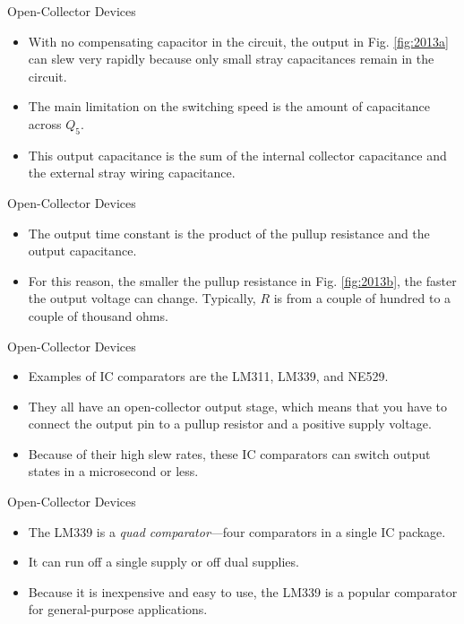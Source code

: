 \documentclass[pdflatex,compress]{beamer}
\begin{document}
\begin{frame}{Open-Collector Devices}
	\begin{itemize}
		\item With no compensating capacitor in the circuit, the output in Fig. \ref{fig:2013a} can slew very rapidly because only small stray capacitances remain in the circuit.
		\item The main limitation on the switching speed is the amount of capacitance across $Q_5$.
		\item This output capacitance is the sum of the internal collector capacitance and the external stray wiring capacitance.
	\end{itemize}
\end{frame}

\begin{frame}{Open-Collector Devices}
	\begin{itemize}
		\item The output time constant is the product of the pullup resistance and the output capacitance. 
		\item For this reason, the smaller the pullup resistance in Fig. \ref{fig:2013b}, the faster the output voltage can change.
		Typically, $R$ is from a couple of hundred to a couple of thousand ohms.
	\end{itemize}
\end{frame}			

\begin{frame}{Open-Collector Devices}
	\begin{itemize}
		\item Examples of IC comparators are the LM311, LM339, and NE529.
		\item They all have an open-collector output stage, which means that you have to connect the output pin to a pullup resistor and a positive supply voltage.
		\item Because of their high slew rates, these IC comparators can switch output states in a microsecond or less.
	\end{itemize}
\end{frame}

\begin{frame}{Open-Collector Devices}
	\begin{itemize}
		\item The LM339 is a \textit{quad comparator}—four comparators in a single IC package. 
		\item It can run off a single supply or off dual supplies.
		\item Because it is inexpensive and easy to use, the LM339 is a popular comparator for general-purpose applications.
	\end{itemize}
\end{frame}
\end{document}
